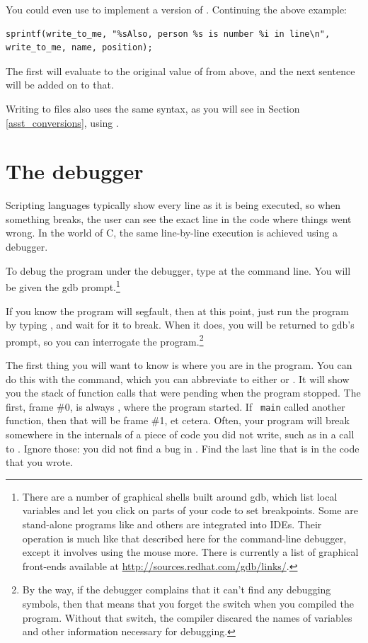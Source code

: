 \documentclass[12pt]{article}
\makeatletter
\def\ind#1{\index{#1}#1}
\def\cind#1{\index{#1@\cinline{#1}}\cinline{#1}}
\makeatother
\begin{document}
You could even use  to implement a version of . Continuing the above example:
\begin{lstlisting}
sprintf(write_to_me, "%sAlso, person %s is number %i in line\n", write_to_me, name, position);
\end{lstlisting}
The first  will evaluate to the original value of  from above, and the next
sentence will be added on to that.

Writing to files also uses the same syntax, as you will see in Section \ref{asst_conversions}, using \cind{fprintf}.

\section{The debugger}   \label{debug}
Scripting languages typically show every line as it is being executed,
so when something breaks, the user can see the exact line in the code
where things went wrong. In the world of C, the same line-by-line
execution is achieved using a debugger.

To debug the program  under the debugger, type  at the command line.  You will be given the gdb
prompt.\footnote{There are a number of graphical shells built
around gdb, which list local variables and let you click on parts of
your code to set breakpoints. Some are stand-alone programs like  and others are integrated into IDEs. Their operation is much like 
that described here for the command-line debugger, except
it involves using the mouse more. There is currently a list of graphical
front-ends available at \url{http://sources.redhat.com/gdb/links/}.}

If you know the program will segfault, then at this point, just run the program
by typing , and wait for it to break. When it does, you will
be returned to gdb's prompt, so you can interrogate the 
program.\footnote{By the way, if the debugger complains that it can't find
any debugging symbols, then that means that you forget the 
switch when you compiled the program. Without that switch, the compiler
discared the names of variables and other information necessary for
debugging.}

The first thing you will want to know is where you are in the program. You
can do this with the  command, which you can abbreviate to
either  or . It will show you the \ind{stack} of function
calls that were pending when the program stopped.  The first, frame
\#0, is always , where the program started. If {\tt
main} called another function, then that will be frame \#1, et cetera.
Often, your program will break somewhere in the internals of a piece of
code you did not write, such as in a call to . Ignore those:
you did not find a bug in . Find the last line that is in
the code that you wrote.
\end{document}
